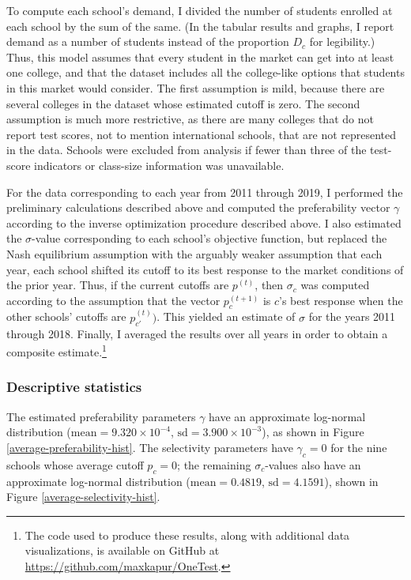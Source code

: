 \documentclass[12pt]{article}
\numberwithin{equation}{subsection}
\theoremstyle{definition}
\begin{document}
To compute each school's demand, I divided the number of students enrolled at each school by the sum of the same. (In the tabular results and graphs, I report demand as a number of students instead of the proportion $D_c$ for legibility.) Thus, this model assumes that every student in the market can get into at least one college, and that the dataset includes all the college-like options that students in this market would consider. The first assumption is mild, because there are several colleges in the dataset whose estimated cutoff is zero. The second assumption is much more restrictive, as there are many colleges that do not report test scores, not to mention international schools, that are not represented in the data. Schools were excluded from analysis if fewer than three of the test-score indicators or class-size information was unavailable. 

For the data corresponding to each year from 2011 through 2019, I performed the preliminary calculations described above and computed the preferability vector $\gamma$ according to the inverse optimization procedure described above. I also estimated the $\sigma$-value corresponding to each school's objective function, but replaced the Nash equilibrium assumption with the arguably weaker assumption that each year, each school shifted its cutoff to its best response to the market conditions of the prior year. Thus, if the current cutoffs are $p^{(t)}$, then $\sigma_c$ was computed according to the assumption that the vector $p_c^{(t+1)}$ is $c$'s best response when the other schools' cutoffs are $p_{c'}^{(t)})$. This yielded an estimate of $\sigma$ for the years 2011 through 2018. Finally, I averaged the results over all years in order to obtain a composite estimate.\footnote{The code used to produce these results, along with additional data visualizations, is available on GitHub at \url{https://github.com/maxkapur/OneTest}.}

\subsubsection{Descriptive statistics}
The estimated preferability parameters $\gamma$ have an approximate log-normal distribution ($\text{mean} = 9.320 \times 10^{-4}$, $\text{sd} = 3.900 \times 10^{-3}$), as shown in Figure \ref{average-preferability-hist}. The selectivity parameters have $\gamma_c = 0$ for the nine schools whose average cutoff $p_c = 0$; the remaining $\sigma_c$-values also have an approximate log-normal distribution ($\text{mean} = 0.4819$, $\text{sd} = 4.1591$), shown in Figure \ref{average-selectivity-hist}.
\end{document}
